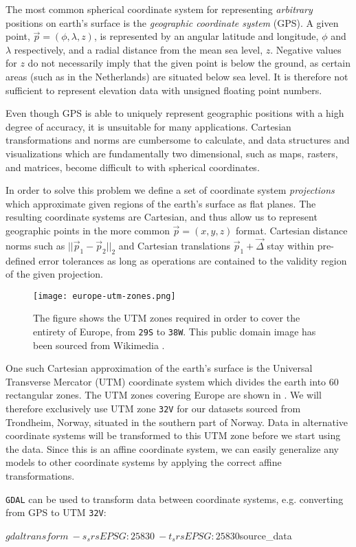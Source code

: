 The most common spherical coordinate system for representing \textit{arbitrary} positions on earth's surface is the \textit{geographic coordinate system} (GPS).
A given point, $\vec{p} = (\phi, \lambda, z)$, is represented by an angular latitude and longitude, $\phi$ and $\lambda$ respectively, and a radial distance from the mean sea level, $z$.
Negative values for $z$ do not necessarily imply that the given point is below the ground, as certain areas (such as in the Netherlands) are situated below sea level.
It is therefore not sufficient to represent elevation data with unsigned floating point numbers.

Even though GPS is able to uniquely represent geographic positions with a high degree of accuracy, it is unsuitable for many applications.
Cartesian transformations and norms are cumbersome to calculate, and data structures and visualizations which are fundamentally two dimensional, such as maps, rasters, and matrices, become difficult to with spherical coordinates.

In order to solve this problem we define a set of coordinate system \textit{projections} which approximate given regions of the earth's surface as flat planes.
The resulting coordinate systems are Cartesian, and thus allow us to represent geographic points in the more common $\vec{p} = (x, y, z)$ format.
Cartesian distance norms such as $||\vec{p}_1 - \vec{p}_2||_2$ and Cartesian translations $\vec{p}_1 + \vec{\Delta}$ stay within pre-defined error tolerances as long as operations are contained to the validity region of the given projection.

\begin{wrapfigure}[15]{r}{0.38\linewidth}
  \vspace{-1em}
  \centering
  \texttt{[image: europe-utm-zones.png]}
  \caption{
    The figure shows the UTM zones required in order to cover the entirety of Europe, from \texttt{29S} to \texttt{38W}.
    This public domain image has been sourced from Wikimedia \cite{wiki:europe_utm_zones}.
  }
  \label{fig:europe-utm-zones}
\end{wrapfigure}

One such Cartesian approximation of the earth's surface is the Universal Transverse Mercator (UTM) coordinate system which divides the earth into 60 rectangular zones. The UTM zones covering Europe are shown in .
We will therefore exclusively use UTM zone \texttt{32V} for our datasets sourced from Trondheim, Norway, situated in the southern part of Norway.
Data in alternative coordinate systems will be transformed to this UTM zone before we start using the data.
Since this is an affine coordinate system, we can easily generalize any models to other coordinate systems by applying the correct affine transformations.

\texttt{GDAL} can be used to transform data between coordinate systems, e.g. converting from GPS to UTM \texttt{32V}:
\begin{shellcode}
$ gdaltransform \
    -s_srs EPSG:25830 \
    -t_srs EPSG:25830 ${source_data}
\end{shellcode}
